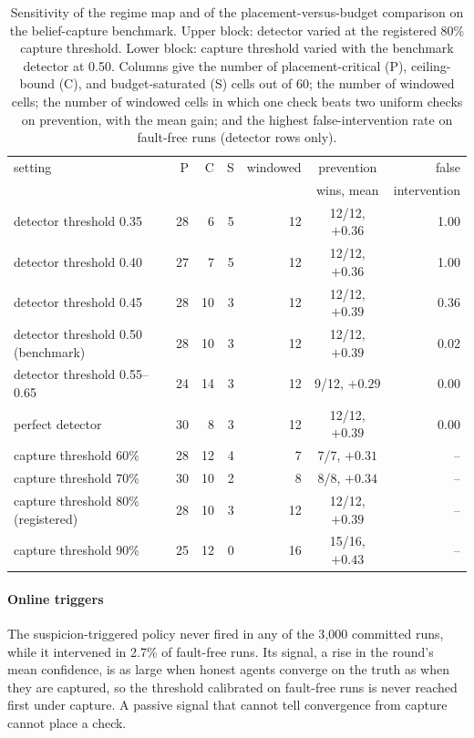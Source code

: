 \documentclass[pdflatex,sn-mathphys-num]{sn-jnl}
\theoremstyle{thmstyleone}%
\begin{document}
\begin{table}[!tbp]
  \caption{Sensitivity of the regime map and of the placement-versus-budget comparison on the belief-capture benchmark. Upper block: detector varied at the registered 80\% capture threshold. Lower block: capture threshold varied with the benchmark detector at 0.50. Columns give the number of placement-critical (P), ceiling-bound (C), and budget-saturated (S) cells out of 60; the number of windowed cells; the number of windowed cells in which one check beats two uniform checks on prevention, with the mean gain; and the highest false-intervention rate on fault-free runs (detector rows only).}
  \label{tab:sens}
  \small
  \setlength{\tabcolsep}{4pt}
  \begin{tabular}{@{}lrrrrcr@{}}
    \toprule
    setting & P & C & S & windowed & prevention & false \\
     & & & & & wins, mean & intervention \\
    \midrule
    detector threshold 0.35 & 28 & 6 & 5 & 12 & 12/12, $+0.36$ & 1.00 \\
    detector threshold 0.40 & 27 & 7 & 5 & 12 & 12/12, $+0.36$ & 1.00 \\
    detector threshold 0.45 & 28 & 10 & 3 & 12 & 12/12, $+0.39$ & 0.36 \\
    detector threshold 0.50 (benchmark) & 28 & 10 & 3 & 12 & 12/12, $+0.39$ & 0.02 \\
    detector threshold 0.55--0.65 & 24 & 14 & 3 & 12 & 9/12, $+0.29$ & 0.00 \\
    perfect detector & 30 & 8 & 3 & 12 & 12/12, $+0.39$ & 0.00 \\
    \midrule
    capture threshold 60\% & 28 & 12 & 4 & 7 & 7/7, $+0.31$ & -- \\
    capture threshold 70\% & 30 & 10 & 2 & 8 & 8/8, $+0.34$ & -- \\
    capture threshold 80\% (registered) & 28 & 10 & 3 & 12 & 12/12, $+0.39$ & -- \\
    capture threshold 90\% & 25 & 12 & 0 & 16 & 15/16, $+0.43$ & -- \\
    \bottomrule
  \end{tabular}
\end{table}

\paragraph{Online triggers}
The suspicion-triggered policy never fired in any of the 3{,}000 committed runs, while it intervened in 2.7\% of fault-free runs. Its signal, a rise in the round's mean confidence, is as large when honest agents converge on the truth as when they are captured, so the threshold calibrated on fault-free runs is never reached first under capture. A passive signal that cannot tell convergence from capture cannot place a check.
\end{document}
